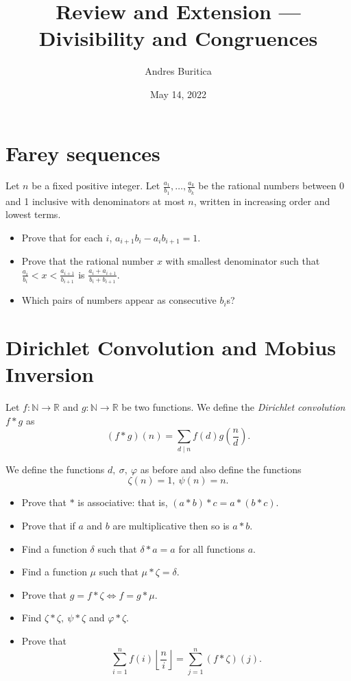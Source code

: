 \documentclass{article}
\title{Review and Extension --- Divisibility and Congruences}
\author{Andres Buritica}
\date{May 14, 2022}
\begin{document}
\maketitle
\section{Farey sequences}
  Let $n$ be a fixed positive integer. Let
  $\frac{a_1}{b_1},\ldots,\frac{a_k}{b_k}$ be the rational numbers between 0
  and 1 inclusive with denominators at most $n$, written in increasing order
  and lowest terms.
  \begin{itemize}
    \item Prove that for each $i$, $a_{i+1}b_i-a_i b_{i+1}=1$.
    \item Prove that the rational number $x$ with smallest denominator such
      that $\frac{a_i}{b_i}<x<\frac{a_{i+1}}{b_{i+1}}$ is
      $\frac{a_i+a_{i+1}}{b_i+b_{i+1}}$. 
    \item Which pairs of numbers appear as consecutive $b_i$s?
  \end{itemize}
\section{Dirichlet Convolution and Mobius Inversion}
  Let $f:\mathbb N\to\mathbb R$ and $g:\mathbb N\to\mathbb R$ be two functions.
  We define the \emph{Dirichlet convolution} $f*g$ as
  \[(f*g)(n)=\sum_{d\mid n}f(d)g\left(\frac nd\right).\]

  We define the functions $d,\ \sigma,\ \varphi$ as before and also define the
  functions \[\zeta(n)=1,\ \psi(n)=n.\]
  \begin{itemize}
    \item Prove that $*$ is associative: that is,
      $(a*b)*c=a*(b*c)$.
    \item Prove that if $a$ and $b$ are multiplicative then so is $a*b$.
    \item Find a function $\delta$ such that $\delta*a=a$ for all functions $a$.
    \item Find a function $\mu$ such that $\mu*\zeta=\delta$.
    \item Prove that $g=f*\zeta\iff f=g*\mu$.
    \item Find $\zeta*\zeta,\ \psi*\zeta$ and $\varphi*\zeta$.
    \item Prove that
      \[\sum_{i=1}^n f(i)\left\lfloor\frac
          ni\right\rfloor=\sum_{j=1}^n(f*\zeta)(j).\]
  \end{itemize}
\newpage
\end{document}
